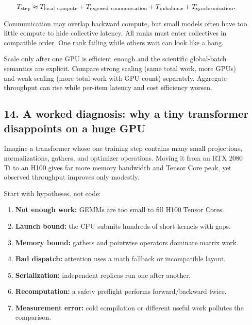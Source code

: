 \documentclass[
  10pt,
  letterpaper,
]{article}
\providecommand{\tightlist}{%
  \setlength{\itemsep}{0pt}\setlength{\parskip}{0pt}}
\begin{document}
\[
T_{\rm step}
\approx
T_{\rm local\ compute}
+T_{\rm exposed\ communication}
+T_{\rm imbalance}
+T_{\rm synchronization}.
\]

Communication may overlap backward compute, but small models often have
too little compute to hide collective latency. All ranks must enter
collectives in compatible order. One rank failing while others wait can
look like a hang.

Scale only after one GPU is efficient enough and the scientific
global-batch semantics are explicit. Compare strong scaling (same total
work, more GPUs) and weak scaling (more total work with GPU count)
separately. Aggregate throughput can rise while per-item latency and
cost efficiency worsen.

\subsection{14. A worked diagnosis: why a tiny transformer disappoints
on a huge
GPU}\label{14-a-worked-diagnosis-why-a-tiny-transformer-disappoints-on-a-huge-gpu}

Imagine a transformer whose one training step contains many small
projections, normalizations, gathers, and optimizer operations. Moving
it from an RTX 2080 Ti to an H100 gives far more memory bandwidth and
Tensor Core peak, yet observed throughput improves only modestly.

Start with hypotheses, not code:

\begin{enumerate}
\def\labelenumi{\arabic{enumi}.}
\tightlist
\item
  \textbf{Not enough work:} GEMMs are too small to fill H100 Tensor
  Cores.
\item
  \textbf{Launch bound:} the CPU submits hundreds of short kernels with
  gaps.
\item
  \textbf{Memory bound:} gathers and pointwise operators dominate matrix
  work.
\item
  \textbf{Bad dispatch:} attention uses a math fallback or incompatible
  layout.
\item
  \textbf{Serialization:} independent replicas run one after another.
\item
  \textbf{Recomputation:} a safety preflight performs forward/backward
  twice.
\item
  \textbf{Measurement error:} cold compilation or different useful work
  pollutes the comparison.
\end{enumerate}
\end{document}
